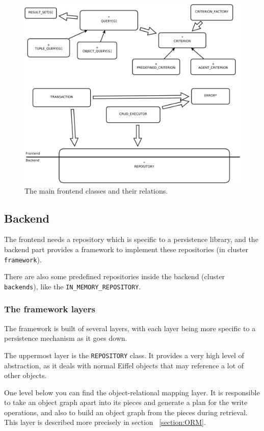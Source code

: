 \begin{figure} [h]
\centering
\includegraphics[trim= 0mm -10mm 0mm -10mm,clip, width = 13cm] {includes/frontend.png}
\caption{The main frontend classes and their relations.}
\label{fig:frontend_classes}
\end{figure}


\subsection{Backend}

The frontend needs a repository which is specific to a persistence library, and the backend part provides a framework to implement these repositories (in cluster \lstinline!framework!).

There are also some predefined repositories inside the backend (cluster \lstinline!backends!), like the \lstinline!IN_MEMORY_REPOSITORY!.

\subsubsection{The framework layers}

The framework is built of several layers, with each layer being more specific to a persistence mechanism as it goes down.

The uppermost layer is the \lstinline!REPOSITORY! class. 
It provides a very high level of abstraction, as it deals with normal Eiffel objects that may reference a lot of other objects.

One level below you can find the object-relational mapping layer.
It is responsible to take an object graph apart into its pieces and generate a plan for the write operations, and also to build an object graph from the pieces during retrieval.
This layer is described more precisely in section ~\ref{section:ORM}.

